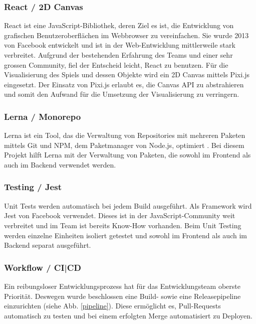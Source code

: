 \documentclass[11pt,a4paper,titlepage]{article}
\begin{document}
\subsubsection{React / 2D Canvas}
React ist eine JavaScript-Bibliothek, deren Ziel es ist, die Entwicklung von grafischen Benutzeroberflächen im Webbrowser zu vereinfachen. Sie wurde 2013 von Facebook entwickelt \cite{react-handbook} und ist in der Web-Entwicklung mittlerweile stark verbreitet.
Aufgrund der bestehenden Erfahrung des Teams und einer sehr grossen Community, fiel der Entscheid leicht, React zu benutzen.
Für die Visualisierung des Spiels und dessen Objekte wird ein 2D Canvas mittels Pixi.js eingesetzt. Der Einsatz von Pixi.js erlaubt es, die Canvas API zu abstrahieren und somit den Aufwand für die Umsetzung der Visualisierung zu verringern.

\subsubsection{Lerna / Monorepo}
Lerna ist ein Tool, das die Verwaltung von Repositories mit mehreren Paketen mittels Git und NPM, dem Paketmanager von Node.js, optimiert \cite{lerna}. Bei diesem Projekt hilft Lerna mit der Verwaltung von Paketen, die sowohl im Frontend als auch im Backend verwendet werden.

\subsubsection{Testing / Jest}
Unit Tests werden automatisch bei jedem Build ausgeführt.
Als Framework wird Jest von Facebook verwendet. Dieses ist in der JavaScript-Community weit verbreitet und im Team ist bereits Know-How vorhanden.
Beim Unit Testing werden einzelne Einheiten isoliert getestet und sowohl im Frontend als auch im Backend separat ausgeführt.

\subsubsection{Workflow / CI|CD}
Ein reibungsloser Entwicklungsprozess hat für das Entwicklungsteam oberste Priorität. Deswegen wurde beschlossen eine Build- sowie eine Releasepipeline einzurichten (siehe Abb. \ref{pipeline}). Diese ermöglicht es, Pull-Requests automatisch zu testen und bei einem erfolgten Merge automatisiert zu Deployen.
\end{document}
